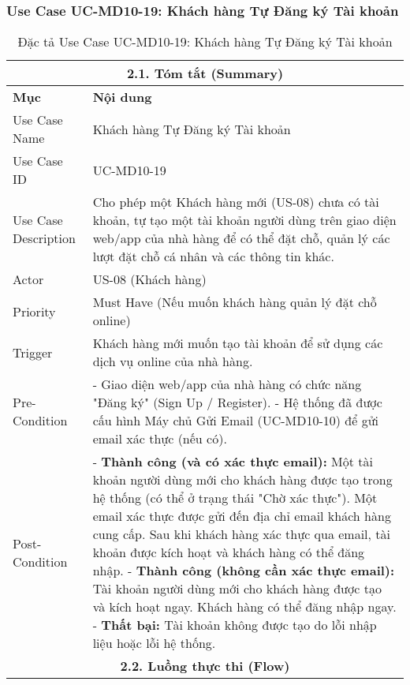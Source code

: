 \subsubsection{Use Case UC-MD10-19: Khách hàng Tự Đăng ký Tài khoản}
\begin{longtable}{|m{4cm}|p{11cm}|}
\caption{Đặc tả Use Case UC-MD10-19: Khách hàng Tự Đăng ký Tài khoản} \label{tab:uc_md10_19_customer_registration_in_codeblock} \\
\hline
\multicolumn{2}{|c|}{\textbf{2.1. Tóm tắt (Summary)}} \\
\hline
\textbf{Mục} & \textbf{Nội dung} \\
\hline
\endhead %
\midrule
\endfoot %
\bottomrule
\endlastfoot %
Use Case Name & Khách hàng Tự Đăng ký Tài khoản \\
\hline
Use Case ID & UC-MD10-19 \\
\hline
Use Case Description & Cho phép một Khách hàng mới (US-08) chưa có tài khoản, tự tạo một tài khoản người dùng trên giao diện web/app của nhà hàng để có thể đặt chỗ, quản lý các lượt đặt chỗ cá nhân và các thông tin khác. \\
\hline
Actor & US-08 (Khách hàng) \\
\hline
Priority & Must Have (Nếu muốn khách hàng quản lý đặt chỗ online) \\
\hline
Trigger & Khách hàng mới muốn tạo tài khoản để sử dụng các dịch vụ online của nhà hàng. \\
\hline
Pre-Condition & - Giao diện web/app của nhà hàng có chức năng "Đăng ký" (Sign Up / Register). \newline - Hệ thống đã được cấu hình Máy chủ Gửi Email (UC-MD10-10) để gửi email xác thực (nếu có). \\
\hline
Post-Condition & - \textbf{Thành công (và có xác thực email):} Một tài khoản người dùng mới cho khách hàng được tạo trong hệ thống (có thể ở trạng thái "Chờ xác thực"). Một email xác thực được gửi đến địa chỉ email khách hàng cung cấp. Sau khi khách hàng xác thực qua email, tài khoản được kích hoạt và khách hàng có thể đăng nhập. \newline - \textbf{Thành công (không cần xác thực email):} Tài khoản người dùng mới cho khách hàng được tạo và kích hoạt ngay. Khách hàng có thể đăng nhập ngay. \newline - \textbf{Thất bại:} Tài khoản không được tạo do lỗi nhập liệu hoặc lỗi hệ thống. \\
\hline
\multicolumn{2}{|c|}{\textbf{2.2. Luồng thực thi (Flow)}} \\

\end{longtable}
